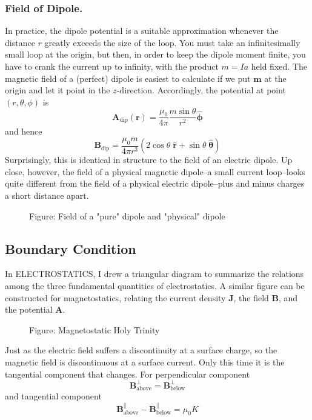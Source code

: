 \documentclass[../../../main.tex]{subfiles}
\begin{document}
\subsubsection{Field of Dipole.} In practice, the dipole potential is a suitable approximation whenever 
the distance $r$ greatly exceeds the size of the loop. You must take an inﬁnitesimally small loop at the origin, but then, in order to keep the dipole moment ﬁnite, you have to crank the current up to inﬁnity, with the product $m = I a$ held ﬁxed. The magnetic ﬁeld of a (perfect) dipole is easiest to calculate if we put $\mathbf{m}$ at the origin and let it point in the $z$-direction. Accordingly, the potential at point $(r, \theta, \phi)$ is 
\begin{equation*}
    \mathbf{A}_\text{dip}(\mathbf{r})=\frac{\mu_0 }{4\pi  }\frac{m\sin\theta}{r^2}\boldsymbol{\hat{\phi}}
\end{equation*}
and hence
\begin{equation*}
    \mathbf{B}_\text{dip}=\frac{\mu_0 m}{4\pi  r^3}(2\cos \theta \;\mathbf{\hat{r}}+ \sin\theta\;\boldsymbol{\hat{\theta}})
\end{equation*}
Surprisingly, this is identical in structure to the ﬁeld of an electric dipole. Up close, however, the ﬁeld of a physical magnetic dipole--a small current loop--looks quite different from the ﬁeld of a physical electric 
dipole--plus and minus charges a short distance apart.
\begin{figure*}[ht]
    \centering
    \caption*{Figure: Field of a "pure" dipole and "physical" dipole}
\end{figure*}

\subsection{Boundary Condition}
In ELECTROSTATICS, I drew a triangular diagram to summarize the relations among the three fundamental quantities of electrostatics. A similar ﬁgure can be constructed for magnetostatics, relating the current density \textbf{J}, the ﬁeld \textbf{B}, and the potential \textbf{A}.

\begin{figure*}[ht]
    \centering
    \caption*{Figure: Magnetostatic Holy Trinity}
\end{figure*}

Just as the electric ﬁeld suffers a discontinuity at a surface charge, so the magnetic ﬁeld is discontinuous at a surface current. Only this time it is the tangential component that changes. For perpendicular component
\begin{equation*}
    \mathbf{B}_\text{above}^{\bot}=\mathbf{B}_\text{below}^{\bot}
\end{equation*}
and tangential component
\begin{equation*}
    \mathbf{B}_\text{above}^{||}-\mathbf{B}_\text{below}^{||}=\mu_0K
\end{equation*}
\end{document}
